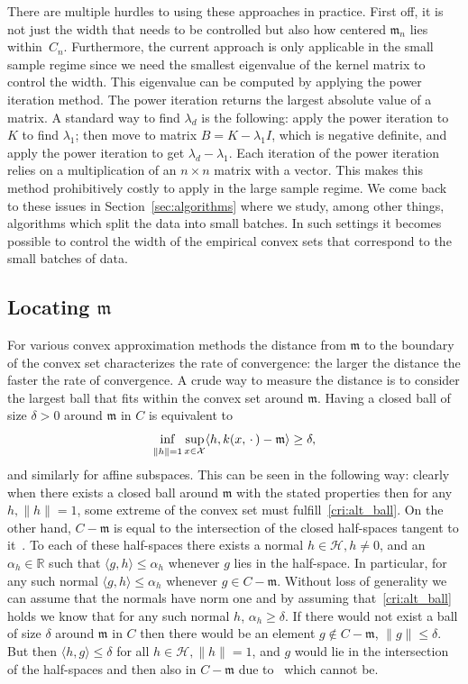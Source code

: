 \documentclass[AHL,Unicode,longabstracts,published]{cedram}
\theoremstyle{remark}
\DeclareMathOperator*{\infd}{inf\vphantom{p}}
\newcommand{\R}{\mathbb{R}}
\newcommand{\X}{\mathcal{X}}
\newcommand{\cH}{\mathcal{H}}
\newcommand{\mean}{\mathfrak{m}}
\begin{document}
There are multiple hurdles to using these approaches in practice. First off, it is not just the width that needs to be controlled but also how centered $\mean_n$ lies within~$C_n$. Furthermore, the current approach is only applicable in the small sample regime since we need the smallest eigenvalue of the kernel matrix to control the width. This eigenvalue can be computed by applying the power iteration method. The power iteration returns the largest absolute value of a matrix. A standard way to find $\lambda_d$ is the following: apply the power iteration to $K$ to find $\lambda_1$; then move to matrix $B = K - \lambda_1 I$, which is negative definite, and apply the power iteration to get $\lambda_d - \lambda_1$. Each iteration of the power iteration relies on a multiplication of an $n \times n$ matrix with a vector. This makes this method prohibitively costly to apply in the large sample regime. We come back to these issues in Section~\ref{sec:algorithms} where we study, among other things, algorithms which split the data into small batches. In such settings it becomes possible to control the width of the empirical convex sets that correspond to the small batches of data.



\subsection{Locating \texorpdfstring{$\mean$}{mean}}\label{sec:refinement_location}
For various convex approximation methods the distance from $\mean$ to the boundary of the convex set characterizes the rate of convergence: the larger the distance the faster the rate of convergence. A crude way to measure the distance is to consider the largest ball that fits within the convex set around $\mean$. Having a closed ball of size $\delta>0$ around $\mean$ in $C$ is equivalent to
\begin{equation}\label{cri:alt_ball}
\infd_{\|h\| = 1} \sup_{x \in \X} \langle h, k(x,\,\cdot\,) - \mean \rangle \geq \delta,
\end{equation}
and similarly for affine subspaces. This can be seen in the following way: clearly when there exists a closed ball around $\mean$ with the stated properties then for any $h, \|h\|=1$, some extreme of the convex set must fulfill~\eqref{cri:alt_ball}. On the other hand, $C-\mean$ is equal to the intersection of the closed half-spaces tangent to it~\cite[Theorem~18.8]{ROCK72}. To each of these half-spaces there exists a normal $h \in \cH, h\not =0$, and an $\alpha_h \in \R$ such that $\langle g,h \rangle \leq \alpha_h$ whenever $g$ lies in the half-space. In particular, for any such normal $\langle g,h \rangle \leq \alpha_h$ whenever $g \in C-\mean$. Without loss of generality we can assume that the normals have norm one and by assuming that~\eqref{cri:alt_ball} holds we know that for any such normal $h$, $\alpha_h \geq \delta$. If there would not exist a ball of size $\delta$ around $\mean$ in $C$ then there would be an element $g \not \in C-\mean$, $\|g\| \leq \delta$. But then $\langle h,g \rangle \leq \delta$ for all $h\in \cH, \|h\|=1$, and $g$ would lie in the intersection of the half-spaces and then also in $C - \mean$ due to~\cite[Theorem~18.8]{ROCK72} which cannot be.
\end{document}
